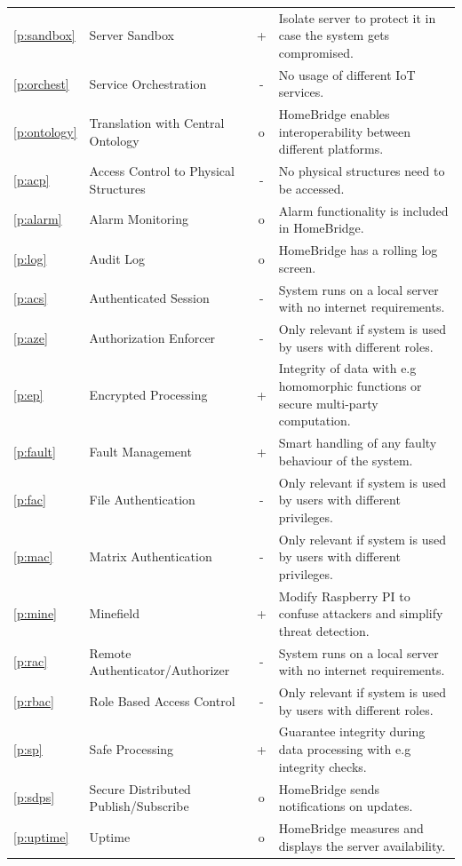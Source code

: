 \begin{landscape}
\begin{longtable}[c]{llcp{12cm}}
	\ref{p:sandbox} & Server Sandbox & + & Isolate server to protect it in case the system gets compromised. \\
	\ref{p:orchest} & Service Orchestration & - & No usage of different IoT services. \\
	\ref{p:ontology} & Translation with Central Ontology & o & HomeBridge enables interoperability between different platforms. \\
	\hline
	\ref{p:acp} & Access Control to Physical Structures & - & No physical structures need to be accessed. \\
	\ref{p:alarm} & Alarm Monitoring & o & Alarm functionality is included in HomeBridge. \\
	\ref{p:log} & Audit Log & o & HomeBridge has a rolling log screen. \\
	\ref{p:acs} & Authenticated Session & - & System runs on a local server with no internet requirements. \\
	\ref{p:aze} & Authorization Enforcer & - & Only relevant if system is used by users with different roles. \\
	\ref{p:ep} & Encrypted Processing & + & Integrity of data with e.g homomorphic functions or secure multi-party computation. \\
	\ref{p:fault} & Fault Management & + & Smart handling of any faulty behaviour of the system. \\
	\ref{p:fac} & File Authentication & - & Only relevant if system is used by users with different privileges. \\
	\ref{p:mac} & Matrix Authentication & - & Only relevant if system is used by users with different privileges. \\	
	\ref{p:mine} & Minefield & + & Modify Raspberry PI to confuse attackers and simplify threat detection. \\
	\ref{p:rac} & Remote Authenticator/Authorizer & - & System runs on a local server with no internet requirements. \\
	\ref{p:rbac} & Role Based Access Control & - & Only relevant if system is used by users with different roles. \\
	\ref{p:sp} & Safe Processing & + & Guarantee integrity during data processing with e.g integrity checks. \\
	\ref{p:sdps} & Secure Distributed Publish/Subscribe & o & HomeBridge sends notifications on updates. \\
	\ref{p:uptime} & Uptime & o & HomeBridge measures and displays the server availability. \\

\end{longtable}
\end{landscape}
